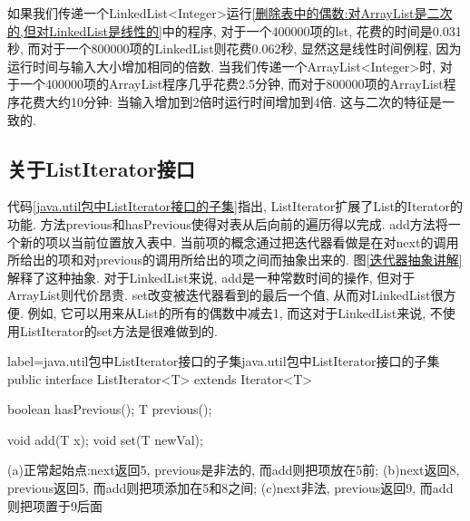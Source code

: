 \documentclass[oneside]{ctexbook}
\begin{document}
如果我们传递一个LinkedList<Integer>运行\ref{删除表中的偶数:对ArrayList是二次的,但对LinkedList是线性的}中的程序, 对于一个400000项的lst, 花费的时间是0.031秒, 而对于一个800000项的LinkedList则花费0.062秒, 显然这是线性时间例程, 因为运行时间与输入大小增加相同的倍数. 当我们传递一个ArrayList<Integer>时, 对于一个400000项的ArrayList程序几乎花费2.5分钟, 而对于800000项的ArrayList程序花费大约10分钟: 当输入增加到2倍时运行时间增加到4倍. 这与二次的特征是一致的.

\subsection{关于ListIterator接口}

代码\ref{java.util包中ListIterator接口的子集}指出, ListIterator扩展了List的Iterator的功能. 方法previous和hasPrevious使得对表从后向前的遍历得以完成. add方法将一个新的项以当前位置放入表中. 当前项的概念通过把迭代器看做是在对next的调用所给出的项和对previous的调用所给出的项之间而抽象出来的. 图\ref{迭代器抽象讲解}解释了这种抽象. 对于LinkedList来说, add是一种常数时间的操作, 但对于ArrayList则代价昂贵. set改变被迭代器看到的最后一个值, 从而对LinkedList很方便. 例如, 它可以用来从List的所有的偶数中减去1, 而这对于LinkedList来说, 不使用ListIterator的set方法是很难做到的.

\begin{myjava}{label={java.util包中ListIterator接口的子集}}{java.util包中ListIterator接口的子集}
public interface ListIterator<T> extends Iterator<T> {
    boolean hasPrevious();
    T previous();

    void add(T x);
    void set(T newVal);
}
\end{myjava}

\begin{myfigure}[label={迭代器抽象讲解}]{(a)正常起始点:next返回5, previous是非法的, 而add则把项放在5前; (b)next返回8, previous返回5, 而add则把项添加在5和8之间; (c)next非法, previous返回9, 而add则把项置于9后面}\end{myfigure}
\end{document}
